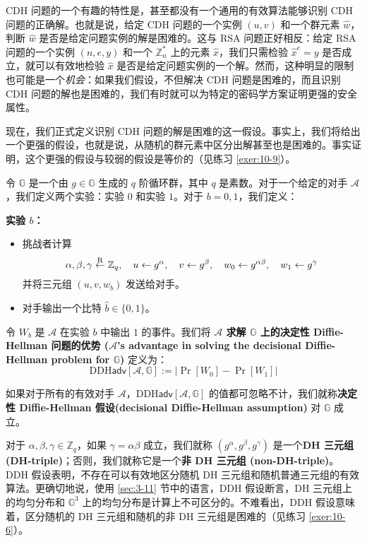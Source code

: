 CDH 问题的一个有趣的特性是，甚至都没有一个通用的有效算法能够识别 CDH 问题的正确解。也就是说，给定 CDH 问题的一个实例 $(u,v)$ 和一个群元素 $\hat{w}$，判断 $\hat{w}$ 是否是给定问题实例的解是困难的。这与 RSA 问题正好相反：给定 RSA 问题的一个实例 $(n,e,y)$ 和一个 $\mathbb{Z}^*_n$ 上的元素 $\hat{x}$，我们只需检验 $\hat{x}^e=y$ 是否成立，就可以有效地检验 $\hat{x}$ 是否是给定问题实例的一个解。然而，这种明显的限制也可能是一个\emph{机会}：如果我们假设，不但解决 CDH 问题是困难的，而且识别 CDH 问题的解也是困难的，我们有时就可以为特定的密码学方案证明更强的安全属性。

现在，我们正式定义识别 CDH 问题的解是困难的这一假设。事实上，我们将给出一个更强的假设，也就是说，从随机的群元素中区分出解甚至也是困难的。事实证明，这个更强的假设与较弱的假设是等价的（见练习 \ref{exer:10-9}）。

\begin{game}\label{game:10-6}
令 $\mathbb{G}$ 是一个由 $g\in\mathbb{G}$ 生成的 $q$ 阶循环群，其中 $q$ 是素数。对于一个给定的对手 $\mathcal{A}$，我们定义两个实验：实验 $0$ 和实验 $1$。对于 $b=0,1$，我们定义：

\noindent\textbf{实验 $b$：}
\begin{itemize}
	\item 挑战者计算
	\[
	\alpha,\beta,\gamma\overset{\rm R}\leftarrow\mathbb{Z}_q,
	\quad
	u\leftarrow g^\alpha,
	\quad
	v\leftarrow g^\beta,
	\quad
	w_0\leftarrow g^{\alpha\beta},
	\quad
	w_1\leftarrow g^{\gamma}
	\]
	并将三元组 $(u,v,w_b)$ 发送给对手。
	\item 对手输出一个比特 $\hat{b}\in\{0,1\}$。
\end{itemize}
令 $W_b$ 是 $\mathcal{A}$ 在实验 $b$ 中输出 $1$ 的事件。我们将 \textbf{$\mathcal{A}$ 求解 $\mathbb{G}$ 上的决定性 Diffie-Hellman 问题的优势 ($\mathcal{A}$'s advantage in solving the decisional Diffie-Hellman problem for $\mathbb{G}$)} 定义为：
\[
\mathrm{DDH}\mathsf{adv}[\mathcal{A},\mathbb{G}]
:=
\big\lvert
\Pr[W_0]-\Pr[W_1]
\big\rvert
\]
\end{game}

\begin{definition}\label{def:10-8}
如果对于所有的有效对手 $\mathcal{A}$，$\mathrm{DDH}\mathsf{adv}[\mathcal{A},\mathbb{G}]$ 的值都可忽略不计，我们就称\textbf{决定性 Diffie-Hellman 假设(decisional Diffie-Hellman assumption)} 对 $\mathbb{G}$ 成立。
\end{definition}

对于 $\alpha,\beta,\gamma\in\mathbb{Z}_q$，如果 $\gamma=\alpha\beta$ 成立，我们就称 $(g^\alpha,g^\beta,g^\gamma)$ 是一个\textbf{DH 三元组 (DH-triple)}；否则，我们就称它是一个\textbf{非 DH 三元组 (non-DH-triple)}。DDH 假设表明，不存在可以有效地区分随机 DH 三元组和随机普通三元组的有效算法。更确切地说，使用 \ref{sec:3-11} 节中的语言，DDH 假设断言，DH 三元组上的均匀分布和 $\mathbb{G}^3$ 上的均匀分布是计算上不可区分的。不难看出，DDH 假设意味着，区分随机的 DH 三元组和随机的非 DH 三元组是困难的（见练习 \ref{exer:10-6}）。

